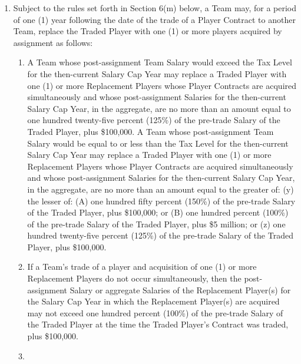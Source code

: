 \documentclass[
]{book}
\providecommand{\tightlist}{%
  \setlength{\itemsep}{0pt}\setlength{\parskip}{0pt}}
\begin{document}
\begin{enumerate}
  \begin{enumerate}
  \def\labelenumii{(\arabic{enumii})}
  \tightlist
  \item
    Subject to the rules set forth in Section 6(m) below, a Team may, for a period of one (1) year following the date of the trade of a Player Contract to another Team, replace the Traded Player with one (1) or more players acquired by assignment as follows:

    \begin{enumerate}
    \def\labelenumiii{(\roman{enumiii})}
    \tightlist
    \item
      A Team whose post-assignment Team Salary would exceed the Tax Level for the then-current Salary Cap Year may replace a Traded Player with one (1) or more Replacement Players whose Player Contracts are acquired simultaneously and whose post-assignment Salaries for the then-current Salary Cap Year, in the aggregate, are no more than an amount equal to one hundred twenty-five percent (125\%) of the pre-trade Salary of the Traded Player, plus \$100,000. A Team whose post-assignment Team Salary would be equal to or less than the Tax Level for the then-current Salary Cap Year may replace a Traded Player with one (1) or more Replacement Players whose Player Contracts are acquired simultaneously and whose post-assignment Salaries for the then-current Salary Cap Year, in the aggregate, are no more than an amount equal to the greater of: (y) the lesser of: (A) one hundred fifty percent (150\%) of the pre-trade Salary of the Traded Player, plus \$100,000; or (B) one hundred percent (100\%) of the pre-trade Salary of the Traded Player, plus \$5 million; or (z) one hundred twenty-five percent (125\%) of the pre-trade Salary of the Traded Player, plus \$100,000.
    \item
      If a Team's trade of a player and acquisition of one (1) or more Replacement Players do not occur simultaneously, then the post-assignment Salary or aggregate Salaries of the Replacement Player(s) for the Salary Cap Year in which the Replacement Player(s) are acquired may not exceed one hundred percent (100\%) of the pre-trade Salary of the Traded Player at the time the Traded Player's Contract was traded, plus \$100,000.
    \item

\end{enumerate}
\end{enumerate}
\end{enumerate}
\end{document}
